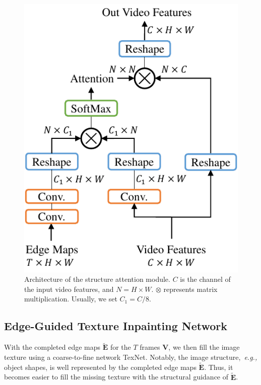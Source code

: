 \begin{figure}[t]
	\centering
	\includegraphics[width=0.65\columnwidth]{SEM} %
	\caption{Architecture of the structure attention module. $C$ is the channel of the input video features, and $N=H\times W$. $\otimes$ represents matrix multiplication. Usually, we set $C_1=C/8$.}
	\label{SEM}
\end{figure} 





\subsection{Edge-Guided Texture Inpainting Network}


With the completed edge maps $\boldsymbol{\widetilde{E}}$ for the $T$ frames $\boldsymbol{V}$, we then fill the image texture using a coarse-to-fine network TexNet.
%
Notably, the image structure,~\emph{e.g.,} object shapes, is well represented by the completed edge maps $\boldsymbol{\widetilde{E}}$.
Thus, it becomes easier to fill the missing texture with the structural guidance of $\boldsymbol{\widetilde{E}}$.

